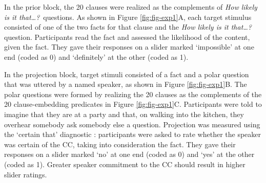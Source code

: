 \documentclass[OpenMind]{stjour}
\begin{document}
In the prior block, the 20 clauses were realized as the complements of {\em How likely is it that\ldots?}~questions. As shown in Figure \ref{fig:fig-exp1}A, each target stimulus consisted of one of the two facts for that clause and the {\em How likely is it that\ldots?} question. 
Participants read the fact and assessed the likelihood of the content, given the fact. They gave their responses on a slider marked `impossible' at one end (coded as 0) and `definitely' at the other (coded as 1). 

In the projection block, target stimuli consisted of a fact and a polar question that was uttered by a named speaker, as shown in Figure \ref{fig:fig-exp1}B. The polar questions were formed by realizing the 20 clauses as the complements of the 20 clause-embedding predicates in Figure \ref{fig:fig-exp1}C. Participants were told to imagine that they are at a party and that, on walking into the kitchen, they overhear somebody ask somebody else a question. Projection was measured using the `certain that' diagnostic \citep{djaerv-bacovcin-salt27,tbd-variability, lorson2018, mahler2020}: participants were asked to rate whether the speaker was certain of the CC, taking into consideration the fact. They gave their responses on a slider marked `no' at one end (coded as 0) and `yes' at the other (coded as 1). Greater speaker commitment to the CC should result in higher slider ratings.
\end{document}
